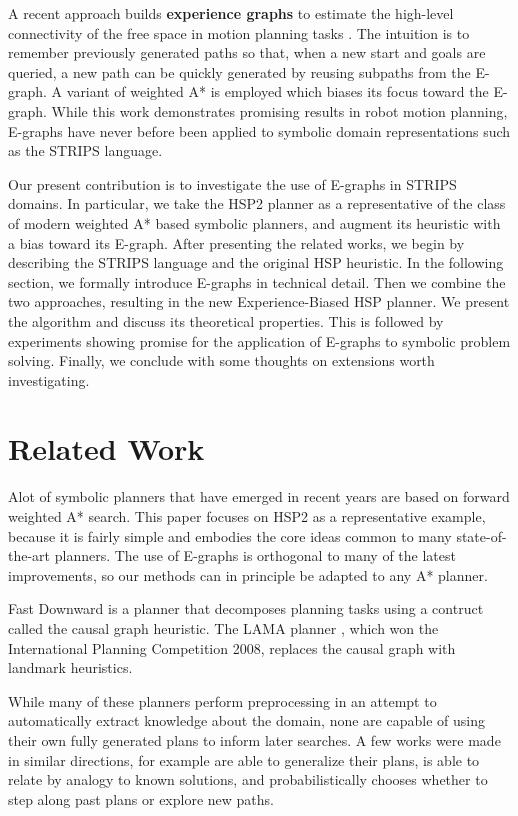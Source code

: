 \documentclass[letterpaper]{article}
\begin{document}
A recent approach builds \textbf{experience graphs} to estimate the high-level connectivity of the free space in motion planning tasks \cite{phillips2012graphs}.
The intuition is to remember previously generated paths so that, when a new start and goals are queried, a new path can be quickly generated by reusing subpaths from the E-graph.
A variant of weighted A* is employed which biases its focus toward the E-graph.
While this work demonstrates promising results in robot motion planning, E-graphs have never before been applied to symbolic domain representations such as the STRIPS language.

Our present contribution is to investigate the use of E-graphs in STRIPS domains. In particular, we take the HSP2 planner \cite{bonet2001planning} as a representative of the class of modern weighted A* based symbolic planners, and augment its heuristic with a bias toward its E-graph. After presenting the related works, we begin by describing the STRIPS language and the original HSP heuristic. In the following section, we formally introduce E-graphs in technical detail. Then we combine the two approaches, resulting in the new Experience-Biased HSP planner. We present the algorithm and discuss its theoretical properties. This is followed by experiments showing promise for the application of E-graphs to symbolic problem solving. Finally, we conclude with some thoughts on extensions worth investigating.

\section{Related Work}

Alot of symbolic planners that have emerged in recent years are based on forward weighted A* search. This paper focuses on HSP2 as a representative example, because it is fairly simple and embodies the core ideas common to many state-of-the-art planners. The use of E-graphs is orthogonal to many of the latest improvements, so our methods can in principle be adapted to any A* planner.

Fast Downward \cite{helmert2006fast} is a planner that decomposes planning tasks using a contruct called the causal graph heuristic. The LAMA planner \cite{richter2010lama}, which won the International Planning Competition 2008, replaces the causal graph with landmark heuristics.

While many of these planners perform preprocessing in an attempt to automatically extract knowledge about the domain, none are capable of using their own fully generated plans to inform later searches. A few works were made in similar directions, for example \cite{fikes1972learning} are able to generalize their plans, \cite{veloso1992learning} is able to relate by analogy to known solutions, and \cite{borrajo2012probabilistically} probabilistically chooses whether to step along past plans or explore new paths.
\end{document}

